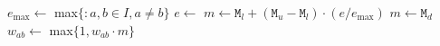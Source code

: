 \begin{algorithm}[ht]
    \caption{\texttt{update\_weights}}
    \begin{algorithmic}[1]
        \State $e_\text{max} \gets$ max$\{$$ : a,b \in I,  a \neq b\}$  
         
            \State $e \gets$  
                \State $m \gets \texttt{M}_l + (\texttt{M}_u - \texttt{M}_l) \cdot (e / e_\text{max})$ 
            \Else
                \State $m \gets \texttt{M}_d$ 
            \EndIf
            \State $w_{ab} \gets$ max$\{1, w_{ab} \cdot m\}$
        \EndFor
    \end{algorithmic}
    \label{alg:iterate_weights}
\end{algorithm}